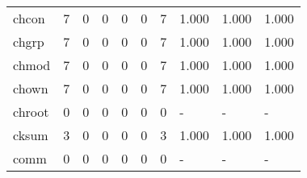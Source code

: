 \begin{longtable}{lp{1.3cm}p{1.3cm}p{1.3cm}p{1.3cm}p{1.3cm}p{1.3cm}p{1.3cm}p{1.3cm}p{1.3cm}}
chcon     &                      7 &                                  0 &                                 0 &                                0 &                                 0 &                               7 &                                1.000 &                                  1.000 &                                1.000 \\
chgrp     &                      7 &                                  0 &                                 0 &                                0 &                                 0 &                               7 &                                1.000 &                                  1.000 &                                1.000 \\
chmod     &                      7 &                                  0 &                                 0 &                                0 &                                 0 &                               7 &                                1.000 &                                  1.000 &                                1.000 \\
chown     &                      7 &                                  0 &                                 0 &                                0 &                                 0 &                               7 &                                1.000 &                                  1.000 &                                1.000 \\
chroot    &                      0 &                                  0 &                                 0 &                                0 &                                 0 &                               0 &                                    - &                                      - &                                    - \\
cksum     &                      3 &                                  0 &                                 0 &                                0 &                                 0 &                               3 &                                1.000 &                                  1.000 &                                1.000 \\
comm      &                      0 &                                  0 &                                 0 &                                0 &                                 0 &                               0 &                                    - &                                      - &                                    - \\

\end{longtable}
